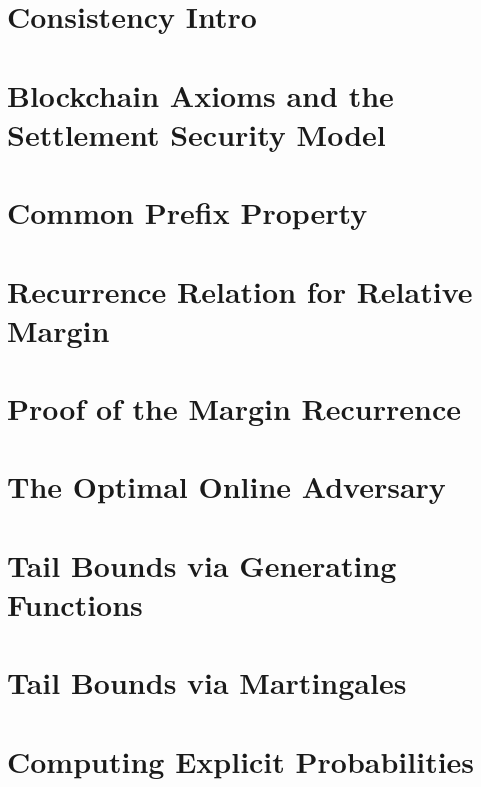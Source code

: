 \chapter{Consistency Intro}\label{ch:cons-intro}


\chapter{Blockchain Axioms and the Settlement Security Model}\label{sec:model}

\label{sec:definitions}

\chapter{Common Prefix Property}\label{sec:cp-forks}


\chapter{Recurrence Relation for Relative Margin}\label{sec:recursion}


\chapter{Proof of the Margin Recurrence}\label{sec:margin-proof}


\chapter{The Optimal Online Adversary}\label{sec:canonical-forks}


\chapter{Tail Bounds via Generating Functions}
\label{sec:estimates}

\chapter{Tail Bounds via Martingales}\label{sec:martingale-proof}


\chapter{Computing Explicit Probabilities}\label{sec:exact-prob}

